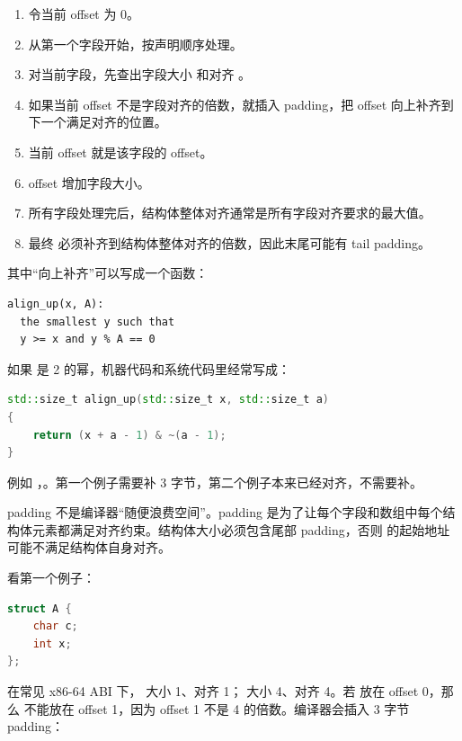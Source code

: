 \begin{enumerate}
  \item 令当前 offset 为 0。
  \item 从第一个字段开始，按声明顺序处理。
  \item 对当前字段，先查出字段大小  和对齐 。
  \item 如果当前 offset 不是字段对齐的倍数，就插入 padding，把 offset 向上补齐到下一个满足对齐的位置。
  \item 当前 offset 就是该字段的 offset。
  \item offset 增加字段大小。
  \item 所有字段处理完后，结构体整体对齐通常是所有字段对齐要求的最大值。
  \item 最终  必须补齐到结构体整体对齐的倍数，因此末尾可能有 tail padding。
\end{enumerate}

其中“向上补齐”可以写成一个函数：

\begin{lstlisting}
align_up(x, A):
  the smallest y such that
  y >= x and y % A == 0
\end{lstlisting}

如果  是 2 的幂，机器代码和系统代码里经常写成：

\begin{lstlisting}[language=C++]
std::size_t align_up(std::size_t x, std::size_t a)
{
    return (x + a - 1) & ~(a - 1);
}
\end{lstlisting}

例如 ，。第一个例子需要补 3 字节，第二个例子本来已经对齐，不需要补。

\begin{keyidea}
padding 不是编译器“随便浪费空间”。padding 是为了让每个字段和数组中每个结构体元素都满足对齐约束。结构体大小必须包含尾部 padding，否则  的起始地址可能不满足结构体自身对齐。
\end{keyidea}

看第一个例子：

\begin{lstlisting}[language=C++]
struct A {
    char c;
    int x;
};
\end{lstlisting}

在常见 x86-64 ABI 下， 大小 1、对齐 1； 大小 4、对齐 4。若  放在 offset 0，那么  不能放在 offset 1，因为 offset 1 不是 4 的倍数。编译器会插入 3 字节 padding：


